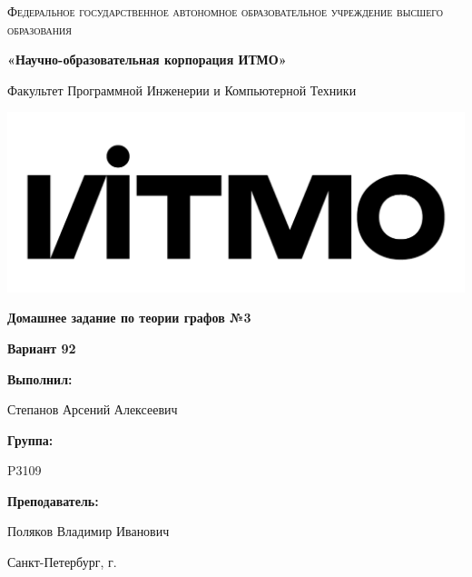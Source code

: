 \documentclass[12pt,a4paper]{report}
\begin{document}
\begin{titlepage} 
	\centering
	{
        \scshape
        Федеральное государственное автономное образовательное учреждение высшего образования
        \par
        \textbf{«Научно-образовательная корпорация ИТМО»}
        \par
        \vspace*{1cm}
        Факультет Программной Инженерии и Компьютерной Техники
        \par
    }
    \vspace*{0.6cm}
    \includegraphics[width=\textwidth]{logo.png}
    {
        \Large
        \textbf{Домашнее задание по теории графов №3}
        \par
        \normalsize
        \vspace*{0.75cm}
        \textbf{Вариант 92}
        \par
    }
    \vfill
    \hfill\begin{minipage}{\dimexpr\textwidth-7.8cm}
        \textbf{Выполнил:}\par
        Степанов Арсений Алексеевич\par
        \vspace*{0.15cm}
        \textbf{Группа:}\par
        P3109\par
        \vspace*{0.15cm}
        \textbf{Преподаватель:}\par
        Поляков Владимир Иванович\par
    \end{minipage}
    \vfill
    Санкт-Петербург, \the\year{}г.
\end{titlepage}  
\onehalfspacing
\end{document}
